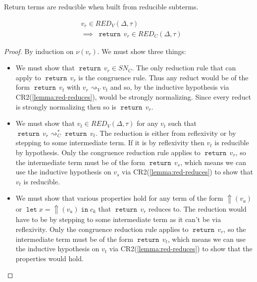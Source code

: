 \documentclass[acmsmall, screen, review, anonymous]{acmart}
\theoremstyle{definition}
\newcommand{\reflectname}{\mathord{\Uparrow}}
\newcommand{\performraw}[2]{\mathop{\reflectname(#1(#2))}}
\newcommand{\perform}[3]{\performraw{#1}{#2}(#3)}
\newcommand{\loc}{\ell}
\newcommand{\returnname}{\mathop{\mathtt{return}}}
\newcommand{\return}[1]{\returnname\, #1}
\newcommand{\letvname}{\mathop{\mathtt{let}}}
\newcommand{\letv}[3]{\letvname #1 = #2 \mathop{\mathtt{in}} #3}
\newcommand{\stepstoname}{\rightsquigarrow}
\newcommand{\stepstov}{\stepstoname_V}
\newcommand{\reducestoname}{\stepstoname^{*}}
\newcommand{\reducestoc}{\reducestoname_{C}}
\newcommand{\snc}{SN_C}
\newcommand{\bound}[1]{\nu(#1)}
\newcommand{\redname}{RED}
\newcommand{\redvname}{\redname_{V}}
\newcommand{\redv}[2]{\redvname{({#1},{#2})}}
\newcommand{\redcname}{\redname_{C}}
\newcommand{\redc}[2]{\redcname{({#1},{#2})}}
\begin{document}
Return terms are reducible when built from reducible subterms.
\begin{lemma}
\label{lemma:red-return}
\begin{align*}
  &v_r \in \redv{\Delta}{\tau} \\
  &\implies \; \return{v_r} \in \redc{\Delta}{\tau}
\end{align*}
\end{lemma}
\begin{proof}
  By induction on $\bound{v_r}$. We must show three things:
  \begin{itemize}
  \item We must show that $\return{v_r} \in \snc$. The only reduction rule that can apply
    to $\return{v_r}$ is the congruence rule. Thus any reduct would be of
    the form $\return{v_t}$ with $v_r \stepstov v_t$ and so, by the
    inductive hypothesis via CR2(\ref{lemma:red-reduces}), would be
    strongly normalizing. Since every reduct is strongly normalizing then
    so is $\return{v_r}$.
  \item We must show that $v_t \in \redv{\Delta}{\tau}$ for any $v_t$
    such that $\return{v_r} \reducestoc \return{v_t}$. The reduction is
    either from reflexivity or by stepping to some intermediate term. If
    it is by reflexivity then $v_t$ is reducible by hypothesis. Only the
    congruence reduction rule applies to $\return{v_r}$, so the
    intermediate term must be of the form $\return{v_s}$, which means we
    can use the inductive hypothesis on $v_s$ via
    CR2(\ref{lemma:red-reduces}) to show that $v_t$ is reducible.
  \item We must show that various properties hold for any term of the
    form $\perform{\loc}{op}{v_a}$ or
    $\letv{x}{\perform{\loc}{op}{v_a}}{c_k}$ that $\return{v_r}$ reduces
    to. The reduction would have to be by stepping to some intermediate
    term as it can't be via reflexivity. Only the congruence reduction
    rule applies to $\return{v_r}$, so the intermediate term must be of
    the form $\return{v_t}$, which means we can use the inductive
    hypothesis on $v_t$ via CR2(\ref{lemma:red-reduces}) to show that
    the properties would hold.
  \end{itemize}
\end{proof}
\end{document}
